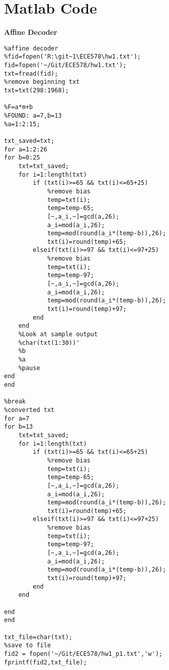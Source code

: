 \documentclass[12pt]{article}
\begin{document}
\section{Matlab Code}
\textbf{Affine Decoder}
\begin{lstlisting}
%affine decoder
%fid=fopen('R:\git~1\ECE578\hw1.txt');
fid=fopen('~/Git/ECE578/hw1.txt');
txt=fread(fid);
%remove beginning txt
txt=txt(298:1968);

%F=a*m+b
%FOUND: a=7,b=13
%a=1:2:15;

txt_saved=txt;
for a=1:2:26
for b=0:25
    txt=txt_saved;
    for i=1:length(txt) 
        if (txt(i)>=65 && txt(i)<=65+25)
            %remove bias
            temp=txt(i);
            temp=temp-65;
            [~,a_i,~]=gcd(a,26);
            a_i=mod(a_i,26);
            temp=mod(round(a_i*(temp-b)),26);
            txt(i)=round(temp)+65;
        elseif(txt(i)>=97 && txt(i)<=97+25)
            %remove bias
            temp=txt(i);
            temp=temp-97;
            [~,a_i,~]=gcd(a,26);
            a_i=mod(a_i,26);
            temp=mod(round(a_i*(temp-b)),26);
            txt(i)=round(temp)+97;
        end       
    end
    %Look at sample output
    %char(txt(1:30))'
    %b
    %a
    %pause
end
end

%break
%converted txt
for a=7
for b=13
    txt=txt_saved;
    for i=1:length(txt) 
        if (txt(i)>=65 && txt(i)<=65+25)
            %remove bias
            temp=txt(i);
            temp=temp-65;
            [~,a_i,~]=gcd(a,26);
            a_i=mod(a_i,26);
            temp=mod(round(a_i*(temp-b)),26);
            txt(i)=round(temp)+65;
        elseif(txt(i)>=97 && txt(i)<=97+25)
            %remove bias
            temp=txt(i);
            temp=temp-97;
            [~,a_i,~]=gcd(a,26);
            a_i=mod(a_i,26);
            temp=mod(round(a_i*(temp-b)),26);
            txt(i)=round(temp)+97;
        end       
    end
    
end
end

txt_file=char(txt);
%save to file
fid2 = fopen('~/Git/ECE578/hw1_p1.txt','w');
fprintf(fid2,txt_file);
\end{lstlisting}
\end{document}
